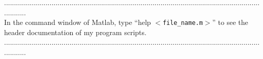 \documentclass[a4paper,12pt]{article} %
\begin{document}
............................................................................................................................................\\
In the command window of Matlab, type ``help $<$\verb|file_name.m|$>$'' to see the header documentation of my program scripts.\\
............................................................................................................................................
\end{document}
